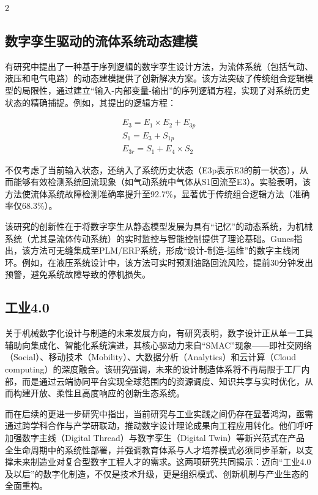 \documentclass[fontset=windows,12pt,UTF8]{ctexart}
\begin{document}
\begin{multicols}{2}
	\subsection{数字孪生驱动的流体系统动态建模}

	有研究中提出了一种基于序列逻辑的数字孪生设计方法，为流体系统（包括气动、液压和电气电路）的动态建模提供了创新解决方案\cite{gunes_digital_2024}。该方法突破了传统组合逻辑模型的局限性，通过建立“输入-内部变量-输出”的序列逻辑方程，实现了对系统历史状态的精确捕捉。例如，其提出的逻辑方程：

	\begin{gather}
		E_3 = E_1 \times E_2 + E_{3p} \\
		S_1 = E_3 + S_{1p} \\
		E_{3r} = S_1 + E_4 \times S_2
	\end{gather}

	不仅考虑了当前输入状态，还纳入了系统历史状态（E3p​表示E3的前一状态），从而能够有效检测系统回流现象（如气动系统中气体从S1回流至E3）。实验表明，该方法使流体系统故障检测准确率提升至92.7\%，显著优于传统组合逻辑方法（准确率仅68.3\%）。

	该研究的创新性在于将数字孪生从静态模型发展为具有“记忆”的动态系统，为机械系统（尤其是流体传动系统）的实时监控与智能控制提供了理论基础。Gunes指出，该方法可无缝集成至PLM/ERP系统，形成“设计-制造-运维”的数字主线闭环。例如，在液压系统设计中，该方法可实时预测油路回流风险，提前30分钟发出预警，避免系统故障导致的停机损失。

	\subsection{工业4.0}

	关于机械数字化设计与制造的未来发展方向，有研究表明，数字设计正从单一工具辅助向集成化、智能化系统演进，其核心驱动力来自“SMAC”现象——即社交网络（Social）、移动技术（Mobility）、大数据分析（Analytics）和云计算（Cloud computing）的深度融合。该研究强调，未来的设计制造体系将不再局限于工厂内部，而是通过云端协同平台实现全球范围内的资源调度、知识共享与实时优化，从而构建开放、柔性且高度响应的创新生态系统\cite{qin_future_2017}。

	而在后续的更进一步研究中指出，当前研究与工业实践之间仍存在显著鸿沟，亟需通过跨学科合作与产学研联动，推动数字设计理论成果向工程应用转化。他们呼吁加强数字主线（Digital Thread）与数字孪生（Digital Twin）等新兴范式在产品全生命周期中的系统性部署，并强调教育体系与人才培养模式必须同步革新，以支撑未来制造业对复合型数字工程人才的需求。这两项研究共同揭示：迈向“工业4.0及以后”的数字化制造，不仅是技术升级，更是组织模式、创新机制与产业生态的全面重构\cite{qin_special_2017}。


\end{multicols}
\end{document}
